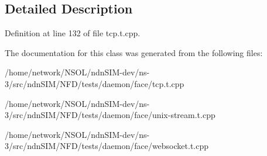 \subsection{Detailed Description}


Definition at line 132 of file tcp.\+t.\+cpp.



The documentation for this class was generated from the following files\+:\begin{DoxyCompactItemize}
\item 
/home/network/\+N\+S\+O\+L/ndn\+S\+I\+M-\/dev/ns-\/3/src/ndn\+S\+I\+M/\+N\+F\+D/tests/daemon/face/tcp.\+t.\+cpp\item 
/home/network/\+N\+S\+O\+L/ndn\+S\+I\+M-\/dev/ns-\/3/src/ndn\+S\+I\+M/\+N\+F\+D/tests/daemon/face/unix-\/stream.\+t.\+cpp\item 
/home/network/\+N\+S\+O\+L/ndn\+S\+I\+M-\/dev/ns-\/3/src/ndn\+S\+I\+M/\+N\+F\+D/tests/daemon/face/websocket.\+t.\+cpp\end{DoxyCompactItemize}
